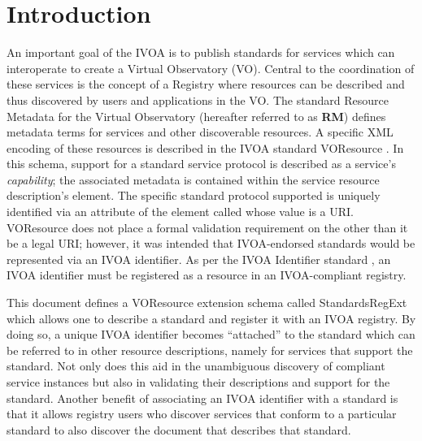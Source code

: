 \documentclass[11pt,a4paper]{ivoa}
\begin{document}
\section{Introduction}

\label{sect:intro}

An important goal of the IVOA is to publish standards for services
which can interoperate to create a Virtual Observatory (VO).  Central
to the coordination of these services is the concept of a Registry
where resources can be described and thus
discovered by users and applications in the VO.  The standard
Resource
Metadata for the Virtual Observatory \citep{2007ivoa.spec.0302H}
(hereafter referred to as \textbf{RM}) defines
metadata terms for services and other discoverable resources.  A
specific XML encoding of these resources is described in the IVOA standard
VOResource \citep{2018ivoa.spec.0625P}.
In this schema, support for a standard service protocol is described
as a service's \emph{capability}; the associated metadata is
contained within the service resource description's
 element.  The
specific standard protocol supported is uniquely identified via an
attribute of the  element called
whose value is a URI.  VOResource does
not place a formal validation requirement on the
 other than it be a legal URI; however, it
was intended that IVOA-endorsed standards would be represented via an
IVOA identifier.  As per the IVOA Identifier standard
\citep{2016ivoa.spec.0523D},
an IVOA identifier must be registered as a
resource in an IVOA-compliant registry.



This document defines a VOResource extension schema called
StandardsRegExt which allows one to describe a standard
and register it with an IVOA registry.  By doing so, a unique IVOA
identifier becomes ``attached'' to the standard which can be referred to
in other resource descriptions, namely for services that support the
standard.  Not only does this aid in the unambiguous discovery of
compliant service instances but also in validating their descriptions
and support for the standard.  Another benefit of associating an IVOA
identifier with a standard is that it allows registry users who discover
services that conform to a particular standard to also discover the
document that describes that standard.
\end{document}
